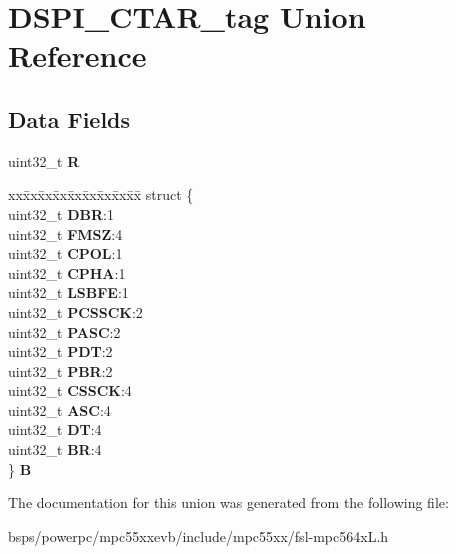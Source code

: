 \hypertarget{unionDSPI__CTAR__tag}{}\section{D\+S\+P\+I\+\_\+\+C\+T\+A\+R\+\_\+tag Union Reference}
\label{unionDSPI__CTAR__tag}
\subsection*{Data Fields}
\begin{DoxyCompactItemize}
\item 
\mbox{\label{unionDSPI__CTAR__tag_a03a917a460254d45b0aafef83ba94f8c}} 
uint32\+\_\+t {\bfseries R}
\item 
\mbox{\label{unionDSPI__CTAR__tag_a45d006aba36ae31d8e85dc19d2faac05}} 
\begin{tabbing}
xx\=xx\=xx\=xx\=xx\=xx\=xx\=xx\=xx\=\kill
struct \{\\
\>uint32\_t {\bfseries DBR}:1\\
\>uint32\_t {\bfseries FMSZ}:4\\
\>uint32\_t {\bfseries CPOL}:1\\
\>uint32\_t {\bfseries CPHA}:1\\
\>uint32\_t {\bfseries LSBFE}:1\\
\>uint32\_t {\bfseries PCSSCK}:2\\
\>uint32\_t {\bfseries PASC}:2\\
\>uint32\_t {\bfseries PDT}:2\\
\>uint32\_t {\bfseries PBR}:2\\
\>uint32\_t {\bfseries CSSCK}:4\\
\>uint32\_t {\bfseries ASC}:4\\
\>uint32\_t {\bfseries DT}:4\\
\>uint32\_t {\bfseries BR}:4\\
\} {\bfseries B}\\

\end{tabbing}\end{DoxyCompactItemize}


The documentation for this union was generated from the following file\+:\begin{DoxyCompactItemize}
\item 
bsps/powerpc/mpc55xxevb/include/mpc55xx/fsl-\/mpc564x\+L.\+h\end{DoxyCompactItemize}

